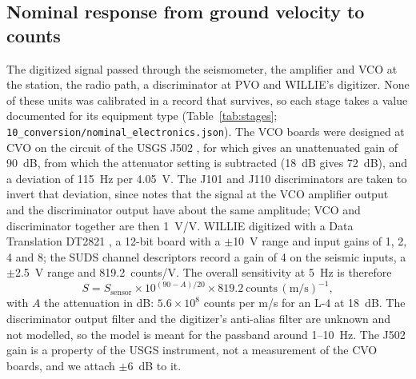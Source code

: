 \documentclass[11pt]{article}
\newcommand{\file}[1]{\texttt{#1}}
\begin{document}
\subsection{Nominal response from ground velocity to counts}

The digitized signal passed through the seismometer, the amplifier and VCO at the station, the radio path, a discriminator at PVO and WILLIE's digitizer. None of these units was calibrated in a record that survives, so each stage takes a value documented for its equipment type (Table~\ref{tab:stages}; \file{10\_conversion/nominal\_electronics.json}). The VCO boards were designed at CVO on the circuit of the USGS J502 \citep{Lockhart_1996}, for which \citet{McChesney_1999} gives an unattenuated gain of 90~dB, from which the attenuator setting is subtracted (18~dB gives 72~dB), and a deviation of 115~Hz per 4.05~V. The J101 and J110 discriminators are taken to invert that deviation, since \citet{McChesney_1999} notes that the signal at the VCO amplifier output and the discriminator output have about the same amplitude; VCO and discriminator together are then 1~V/V. WILLIE digitized with a Data Translation DT2821 \citep{Murray_1996}, a 12-bit board with a $\pm$10~V range and input gains of 1, 2, 4 and 8; the SUDS channel descriptors record a gain of 4 on the seismic inputs, a $\pm$2.5~V range and 819.2~counts/V. The overall sensitivity at 5~Hz is therefore
\[
S = S_\mathrm{sensor}\times10^{(90-A)/20}\times819.2\ \mathrm{counts\,(m/s)^{-1}},
\]
with $A$ the attenuation in dB: $5.6\times10^{8}$ counts per m/s for an L-4 at 18~dB. The discriminator output filter and the digitizer's anti-alias filter are unknown and not modelled, so the model is meant for the passband around 1--10~Hz. The J502 gain is a property of the USGS instrument, not a measurement of the CVO boards, and we attach $\pm$6~dB to it.
\end{document}
